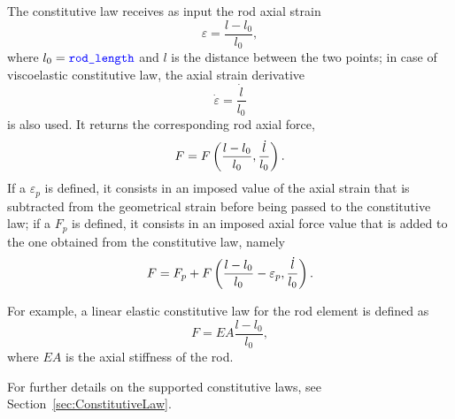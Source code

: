 The constitutive law  receives as input the rod axial strain
\begin{equation}
	\varepsilon = \frac{l - l_0}{l_0} ,
\end{equation}
where $l_0=\textcolor{blue}{\texttt{rod\_length}}$ and $l$ is the distance between the two points;
in case of viscoelastic constitutive law, the axial strain derivative
\begin{equation}
	\dot{\varepsilon} = \frac{\dot{l}}{l_0}
\end{equation}
is also used.
It returns the corresponding rod axial force,
\begin{displaymath}
	F = F\left( \frac{l - l_0}{l_0}, \frac{\dot{l}}{l_0} \right) .
\end{displaymath}
If a  $\varepsilon_p$ is defined,
it consists in an imposed value of the axial strain
that is subtracted from the geometrical strain
before being passed to the constitutive law;
if a  $F_p$ is defined,
it consists in an imposed axial force value
that is added to the one obtained from the constitutive law,
namely
\begin{displaymath}
	F = F_p + F\left( \frac{l - l_0}{l_0} - \varepsilon_p, \frac{\dot{l}}{l_0} \right) .
\end{displaymath}

For example, a linear elastic constitutive law for the rod element
is defined as
\begin{displaymath}
	F = EA \frac{l - l_0}{l_0} ,
\end{displaymath}
where $EA$ is the axial stiffness of the rod.

For further details on the supported constitutive laws, 
see Section~\ref{sec:ConstitutiveLaw}.

